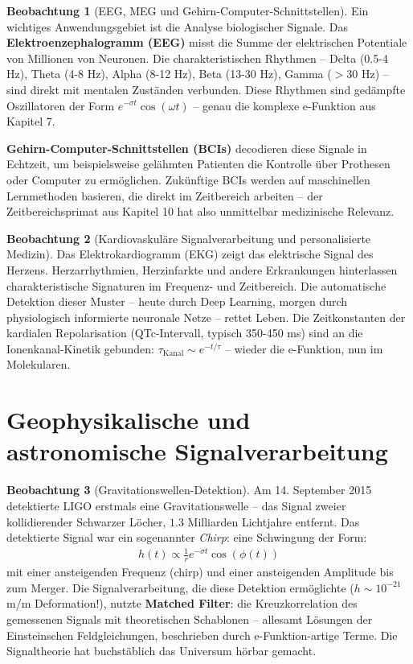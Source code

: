 ﻿\documentclass[a4paper,12pt]{report}
\theoremstyle{definition}
\newtheorem{beobachtung}{Beobachtung}
\begin{document}
	\begin{beobachtung}[EEG, MEG und Gehirn-Computer-Schnittstellen]
		Ein wichtiges Anwendungsgebiet ist die Analyse biologischer Signale. Das \textbf{Elektroenzephalogramm (EEG)} misst die Summe der elektrischen Potentiale von Millionen von Neuronen. Die charakteristischen Rhythmen -- Delta (0.5-4 Hz), Theta (4-8 Hz), Alpha (8-12 Hz), Beta (13-30 Hz), Gamma ($> 30$ Hz) -- sind direkt mit mentalen Zuständen verbunden. Diese Rhythmen sind gedämpfte Oszillatoren der Form $e^{-\sigma t} \cos(\omega t)$ -- genau die komplexe e-Funktion aus Kapitel 7.
		
		\textbf{Gehirn-Computer-Schnittstellen (BCIs)} decodieren diese Signale in Echtzeit, um beispielsweise gelähmten Patienten die Kontrolle über Prothesen oder Computer zu ermöglichen. Zukünftige BCIs werden auf maschinellen Lernmethoden basieren, die direkt im Zeitbereich arbeiten -- der Zeitbereichsprimat aus Kapitel 10 hat also unmittelbar medizinische Relevanz.
	\end{beobachtung}
	
	\begin{beobachtung}[Kardiovaskuläre Signalverarbeitung und personalisierte Medizin]
		Das Elektrokardiogramm (EKG) zeigt das elektri\-sche Signal des Herzens. Herzarrhythmien, Herzinfarkte und andere Erkrankungen hinterlassen charakteristische Signaturen im Frequenz- und Zeitbereich. Die automatische Detektion dieser Muster -- heute durch Deep Learning, morgen durch physiologisch informierte neuronale Netze -- rettet Leben. Die Zeitkonstanten der kardialen Repolarisation (QTc-Intervall, typisch 350-450 ms) sind an die Ionenkanal-Kinetik gebunden: $\tau_{\text{Kanal}} \sim e^{-t/\tau}$ -- wieder die e-Funktion, nun im Molekularen.
	\end{beobachtung}
	
	\section{Geophysikalische und astronomische Signalverarbeitung}
	
	\begin{beobachtung}[Gravitationswellen-Detektion]
		Am 14. September 2015 detektierte LIGO erstmals eine Gravitationswelle -- das Signal zweier kollidierender Schwarzer Löcher, $1.3$ Milliarden Lichtjahre entfernt. Das detektierte Signal war ein sogenannter \emph{Chirp}: eine Schwingung der Form:
		\begin{align}
			h(t) \propto \frac{1}{r} e^{-\sigma t} \cos(\phi(t))
		\end{align}
		mit einer ansteigenden Frequenz (chirp) und einer ansteigenden Amplitude bis zum Merger. Die Signalverarbeitung, die diese Detektion ermöglichte ($h \sim 10^{-21}$ m/m Deformation!), nutzte \textbf{Matched Filter}: die Kreuzkorrelation des gemessenen Signals mit theoretischen Schablonen -- allesamt Lösungen der Einsteinschen Feldgleichungen, beschrieben durch e-Funktion-artige Terme. Die Signaltheorie hat buchstäblich das Universum hörbar gemacht.
	\end{beobachtung}
	
\end{document}
